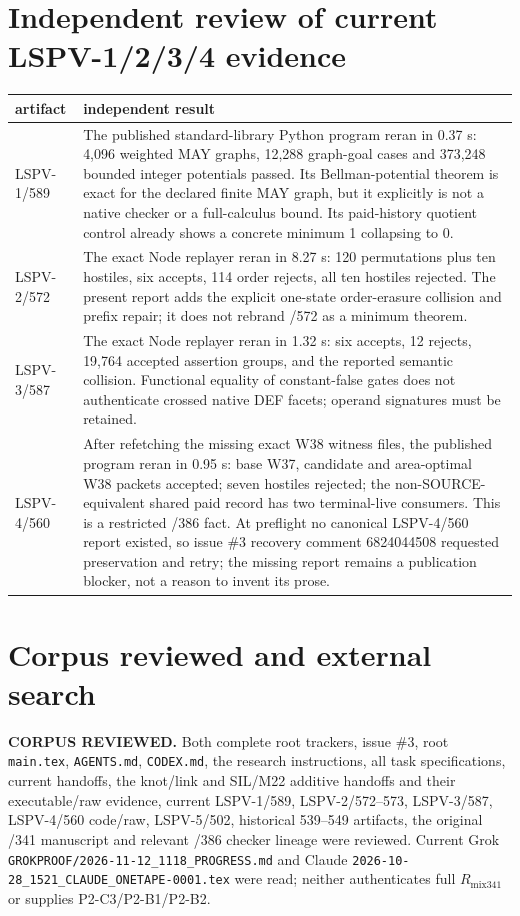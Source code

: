 \documentclass[11pt]{article}
\newcommand{\Rmix}{R_{\mathrm{mix341}}}
\begin{document}
\section{Independent review of current LSPV-1/2/3/4 evidence}
\begin{longtable}{p{}p{}}
\toprule
artifact & independent result\\
\midrule
LSPV-1/589 & The published standard-library Python program reran in 0.37 s: 4,096 weighted MAY graphs, 12,288 graph-goal cases and 373,248 bounded integer potentials passed.  Its Bellman-potential theorem is exact for the declared finite MAY graph, but it explicitly is not a native checker or a full-calculus bound.  Its paid-history quotient control already shows a concrete minimum 1 collapsing to 0.\\
LSPV-2/572 & The exact Node replayer reran in 8.27 s: 120 permutations plus ten hostiles, six accepts, 114 order rejects, all ten hostiles rejected.  The present report adds the explicit one-state order-erasure collision and prefix repair; it does not rebrand /572 as a minimum theorem.\\
LSPV-3/587 & The exact Node replayer reran in 1.32 s: six accepts, 12 rejects, 19,764 accepted assertion groups, and the reported semantic collision.  Functional equality of constant-false gates does not authenticate crossed native DEF facets; operand signatures must be retained.\\
LSPV-4/560 & After refetching the missing exact W38 witness files, the published program reran in 0.95 s: base W37, candidate and area-optimal W38 packets accepted; seven hostiles rejected; the non-SOURCE-equivalent shared paid record has two terminal-live consumers.  This is a restricted /386 fact.  At preflight no canonical LSPV-4/560 report existed, so issue \#3 recovery comment 6824044508 requested preservation and retry; the missing report remains a publication blocker, not a reason to invent its prose.\\
\bottomrule
\end{longtable}

\section{Corpus reviewed and external search}
\textbf{CORPUS REVIEWED.} Both complete root trackers, issue \#3, root \texttt{main.tex}, \texttt{AGENTS.md}, \texttt{CODEX.md}, the research instructions, all task specifications, current handoffs, the knot/link and SIL/M22 additive handoffs and their executable/raw evidence, current LSPV-1/589, LSPV-2/572--573, LSPV-3/587, LSPV-4/560 code/raw, LSPV-5/502, historical 539--549 artifacts, the original /341 manuscript and relevant /386 checker lineage were reviewed.  Current Grok \texttt{GROKPROOF/2026-11-12\_1118\_PROGRESS.md} and Claude \texttt{2026-10-28\_1521\_CLAUDE\_ONETAPE-0001.tex} were read; neither authenticates full \(\Rmix\) or supplies P2-C3/P2-B1/P2-B2.
\end{document}
